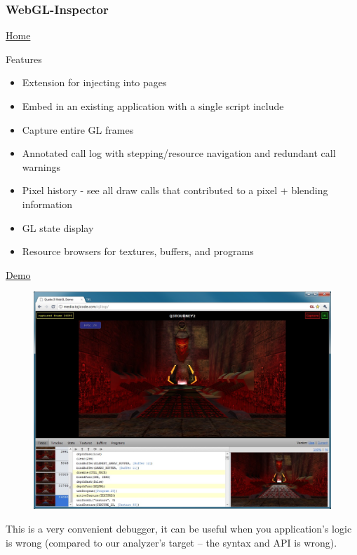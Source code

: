 \documentclass[]{article}
\begin{document}
\subsubsection{WebGL-Inspector}\label{webgl-inspector}

\href{https://benvanik.github.com/WebGL-Inspector/}{Home}

Features

\begin{itemize}
\itemsep1pt\parskip0pt
\item
  Extension for injecting into pages
\item
  Embed in an existing application with a single script include
\item
  Capture entire GL frames
\item
  Annotated call log with stepping/resource navigation and redundant
  call warnings
\item
  Pixel history - see all draw calls that contributed to a pixel +
  blending information
\item
  GL state display
\item
  Resource browsers for textures, buffers, and programs
\end{itemize}

\href{http://benvanik.github.io/WebGL-Inspector/samples/lesson05/embedded.html}{Demo}

\begin{figure}[htbp]
\centering
\includegraphics{images/inspector2.jpg}
\end{figure}

This is a very convenient debugger, it can be useful when you
application's logic is wrong (compared to our analyzer's target -- the
syntax and API is wrong).
\end{document}

